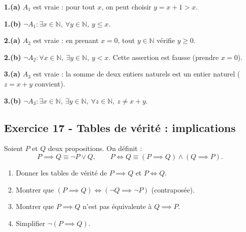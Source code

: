 \documentclass[12pt,a4paper]{article}
\begin{document}
\begin{boitecorrige}
\textbf{1.(a)} $A_1$ est vraie : pour tout $x$, on peut choisir $y = x+1 > x$.

\textbf{1.(b)} $\neg A_1 : \exists x\in\mathbb{N},\ \forall y\in\mathbb{N},\ y \leq x$.

\textbf{2.(a)} $A_2$ est vraie : en prenant $x = 0$, tout $y\in\mathbb{N}$ vérifie $y \geq 0$.

\textbf{2.(b)} $\neg A_2 : \forall x\in\mathbb{N},\ \exists y\in\mathbb{N},\ y < x$. Cette assertion est fausse (prendre $x=0$).

\textbf{3.(a)} $A_3$ est vraie : la somme de deux entiers naturels est un entier naturel ($z = x+y$ convient).

\textbf{3.(b)} $\neg A_3 : \exists x\in\mathbb{N},\ \exists y\in\mathbb{N},\ \forall z\in\mathbb{N},\ z \neq x+y$.
\end{boitecorrige}

\subsection*{Exercice 17 - Tables de vérité : implications \niveau{\moyen}}

\begin{boiteexercice}
Soient $P$ et $Q$ deux propositions. On définit :
\[
P \implies Q \equiv \neg P \vee Q, \qquad P \iff Q \equiv (P\implies Q)\wedge(Q\implies P).
\]
\begin{enumerate}
  \item Donner les tables de vérité de $P\implies Q$ et $P\iff Q$.
  \item Montrer que $(P\implies Q) \iff (\neg Q \implies \neg P)$ (contraposée).
  \item Montrer que $P\implies Q$ n'est pas équivalente à $Q\implies P$.
  \item Simplifier $\neg(P\implies Q)$.
\end{enumerate}
\end{boiteexercice}
\end{document}

